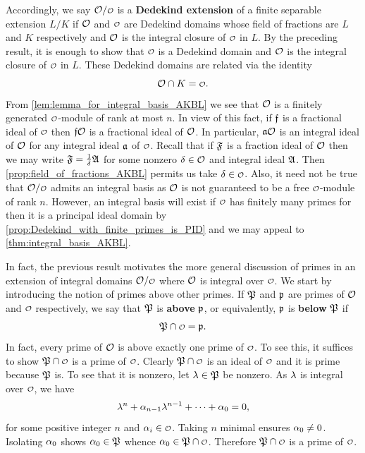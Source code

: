     Accordingly, we say \(\mc{O}/\smc{O}\) is a \textbf{Dedekind extension} of a finite separable extension \(L/K\) if \(\mathcal{O}\) and \(\smc{O}\) are Dedekind domains whose field of fractions are \(L\) and \(K\) respectively and \(\mathcal{O}\) is the integral closure of \(\smc{O}\) in \(L\). By the preceding result, it is enough to show that \(\smc{O}\) is a Dedekind domain and \(\mathcal{O}\) is the integral closure of \(\smc{O}\) in \(L\). These Dedekind domains are related via the identity
    \begin{equation}\label{equ:Dedekind_extension_intersection}
      \mc{O} \cap K = \smc{O}.
    \end{equation}
    From \cref{lem:lemma_for_integral_basis_AKBL} we see that \(\mathcal{O}\) is a finitely generated \(\smc{O}\)-module of rank at most \(n\). In view of this fact, if \(\mathfrak{f}\) is a fractional ideal of \(\smc{O}\) then \(\mathfrak{f}\mathcal{O}\) is a fractional ideal of \(\mathcal{O}\). In particular, \(\mathfrak{a}\mathcal{O}\) is an integral ideal of \(\mathcal{O}\) for any integral ideal \(\mathfrak{a}\) of \(\smc{O}\). Recall that if \(\mathfrak{F}\) is a fraction ideal of \(\mathcal{O}\) then we may write \(\mathfrak{F} = \frac{1}{\delta}\mathfrak{A}\) for some nonzero \(\delta \in \mathcal{O}\) and integral ideal \(\mathfrak{A}\). Then \cref{prop:field_of_fractions_AKBL} permits us take \(\d \in \smc{O}\). Also, it need not be true that \(\mc{O}/\smc{O}\) admits an integral basis as \(\mathcal{O}\) is not guaranteed to be a free \(\smc{O}\)-module of rank \(n\). However, an integral basis will exist if \(\smc{O}\) has finitely many primes for then it is a principal ideal domain by \cref{prop:Dedekind_with_finite_primes_is_PID} and we may appeal to \cref{thm:integral_basis_AKBL}.

    In fact, the previous result motivates the more general discussion of primes in an extension of integral domains \(\mc{O}/\smc{O}\) where \(\mathcal{O}\) is integral over \(\smc{O}\). We start by introducing the notion of primes above other primes. If \(\mathfrak{P}\) and \(\mathfrak{p}\) are primes of \(\mathcal{O}\) and \(\smc{O}\) respectively, we say that \(\mathfrak{P}\) is \textbf{above} \(\mathfrak{p}\), or equivalently, \(\mathfrak{p}\) is \textbf{below} \(\mathfrak{P}\) if
    \[
      \mf{P} \cap \smc{O} = \mf{p}.
    \]
    In fact, every prime of \(\mathcal{O}\) is above exactly one prime of \(\smc{O}\). To see this, it suffices to show \(\mf{P} \cap \smc{O}\) is a prime of \(\smc{O}\). Clearly \(\mf{P} \cap \smc{O}\) is an ideal of \(\smc{O}\) and it is prime because \(\mathfrak{P}\) is. To see that it is nonzero, let \(\lambda \in \mathfrak{P}\) be nonzero. As \(\lambda\) is integral over \(\smc{O}\), we have
    \[
      \lambda^{n}+\alpha_{n-1}\lambda^{n-1}+\cdots+\alpha_{0} = 0,
    \]
    for some positive integer \(n\) and \(\a_{i} \in \smc{O}\). Taking \(n\) minimal ensures \(\alpha_{0} \neq 0\). Isolating \(\alpha_{0}\) shows \(\alpha_{0} \in \mathfrak{P}\) whence \(\a_{0} \in \mf{P} \cap \smc{O}\). Therefore \(\mf{P} \cap \smc{O}\) is a prime of \(\smc{O}\).

